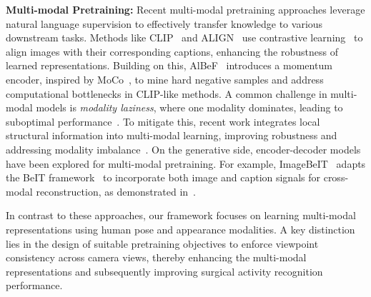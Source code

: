 \noindent \textbf{Multi-modal Pretraining:} Recent multi-modal pretraining approaches leverage natural language supervision to effectively transfer knowledge to various downstream tasks. Methods like CLIP~\citep{CLIP} and ALIGN~\citep{jia2021scaling} use contrastive learning~\citep{oord2018representation} to align images with their corresponding captions, enhancing the robustness of learned representations. Building on this, AlBeF~\citep{AlignBF} introduces a momentum encoder, inspired by MoCo~\citep{MoCo}, to mine hard negative samples and address computational bottlenecks in CLIP-like methods. A common challenge in multi-modal models is \emph{modality laziness}, where one modality dominates, leading to suboptimal performance~\citep{modLaz}. To mitigate this, recent work integrates local structural information into multi-modal learning, improving robustness and addressing modality imbalance~\citep{Yang2022VisionLanguagePW}. On the generative side, encoder-decoder models have been explored for multi-modal pretraining. For example, ImageBeIT~\citep{ImageBeIT} adapts the BeIT framework~\citep{BEiT} to incorporate both image and caption signals for cross-modal reconstruction, as demonstrated in~\citep{ImageBeIT,PeVLPV}.

In contrast to these approaches, our framework focuses on learning multi-modal representations using human pose and appearance modalities. A key distinction lies in the design of suitable pretraining objectives to enforce viewpoint consistency across camera views, thereby enhancing the multi-modal representations and subsequently improving surgical activity recognition performance.